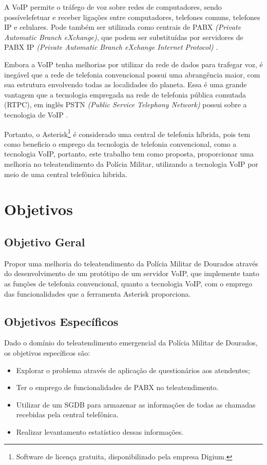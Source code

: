 A VoIP permite o tráfego de voz sobre redes de computadores, sendo possívelefetuar e receber ligações entre computadores, telefones comuns, telefones IP e celulares. Pode também ser utilizada como centrais de PABX \textit{(Private Automatic Branch eXchange)}, que podem ser substituídas por servidores de PABX IP \textit{(Private Automatic Branch eXchange Internet Protocol)} \cite{glauciadasilvaribeiro2011}.

Embora a VoIP tenha melhorias por utilizar da rede de dados para trafegar voz, é inegável que a rede de telefonia convencional possui uma abrangência maior, com sua estrutura envolvendo todas as localidades do planeta. Essa é uma grande vantagem que a tecnologia empregada na rede de telefonia pública comutada (RTPC), em inglês PSTN \textit{(Public Service Telephony Network)} possui sobre a tecnologia de VoIP \cite{theodorewallingford2005}.

Portanto, o Asterisk\footnote{Software de licença gratuita, disponibilizado pela empresa Digium.} é considerado uma central de telefonia híbrida, pois tem como beneficio o emprego da tecnologia de telefonia convencional, como a tecnologia VoIP, portanto, este trabalho tem como proposta, proporcionar uma melhoria no teleatendimento da Polícia Militar, utilizando a tecnologia VoIP por meio de uma central telefônica hibrida.

\section{Objetivos}
\subsection{Objetivo Geral}
Propor uma melhoria do teleatendimento da Polícia Militar de Dourados através do desenvolvimento de um protótipo de um servidor VoIP, que implemente tanto as funções de telefonia convencional, quanto a tecnologia VoIP, com o emprego das funcionalidades que a ferramenta Asterisk proporciona.

\subsection{Objetivos Específicos}
Dado o domínio do teleatendimento emergencial da Polícia Militar de Dourados, os objetivos específicos são:

\begin{itemize}
	\item Explorar o problema através de aplicação de questionários aos atendentes;
	\item Ter o emprego de funcionalidades de PABX no teleatendimento.
	\item Utilizar de um SGDB para armazenar as informações de todas as chamadas recebidas pela central telefônica.
	\item Realizar levantamento estatístico dessas informações.
\end{itemize}

